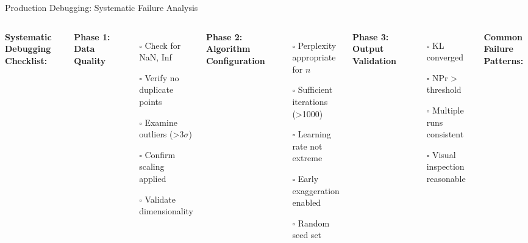 \documentclass[aspectratio=169]{beamer}
\begin{document}
\begin{frame}{Production Debugging: Systematic Failure Analysis}
\begin{columns}
\textbf{Systematic Debugging Checklist:}

\textbf{Phase 1: Data Quality}
\begin{itemize}
\item[$\square$] Check for NaN, Inf
\item[$\square$] Verify no duplicate points
\item[$\square$] Examine outliers (>3$\sigma$)
\item[$\square$] Confirm scaling applied
\item[$\square$] Validate dimensionality
\end{itemize}

\textbf{Phase 2: Algorithm Configuration}
\begin{itemize}
\item[$\square$] Perplexity appropriate for $n$
\item[$\square$] Sufficient iterations (>1000)
\item[$\square$] Learning rate not extreme
\item[$\square$] Early exaggeration enabled
\item[$\square$] Random seed set
\end{itemize}

\textbf{Phase 3: Output Validation}
\begin{itemize}
\item[$\square$] KL converged
\item[$\square$] NPr > threshold
\item[$\square$] Multiple runs consistent
\item[$\square$] Visual inspection reasonable
\end{itemize}

\textbf{Common Failure Patterns:}

\end{columns}
\end{frame}
\end{document}
